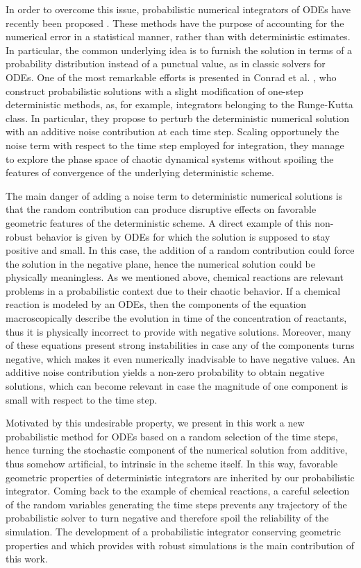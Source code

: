 \documentclass{siamart1116}
\numberwithin{theorem}{section}
\newcommand{\corr}[1]{{\color{bordeaux}#1}}
\begin{document}
In order to overcome this issue, probabilistic numerical integrators of ODEs have recently been proposed \cite{CGS16, KeH16}. These methods have the purpose of accounting for the numerical error in a statistical manner, rather than with deterministic estimates. In particular, the common underlying idea is to furnish the solution in terms of a probability distribution instead of a punctual value, as in classic solvers for ODEs. One of the most remarkable efforts is presented in Conrad et al. \cite{CGS16}, who construct probabilistic solutions with a slight modification of one-step deterministic methods, as, for example, integrators belonging to the Runge-Kutta class. In particular, they propose to perturb the deterministic numerical solution with an additive noise contribution at each time step. Scaling opportunely the noise term with respect to the time step employed for integration, they manage to explore the phase space of chaotic dynamical systems without spoiling the features of convergence of the underlying deterministic scheme. 

The main danger of adding a noise term to deterministic numerical solutions is that the random contribution can produce disruptive effects on favorable geometric features of the deterministic scheme. \corr{A direct example of this non-robust behavior is given by ODEs for which the solution is supposed to stay positive and small. In this case, the addition of a random contribution could force the solution in the negative plane, hence the numerical solution could be physically meaningless. As we mentioned above, chemical reactions are relevant problems in a probabilistic context due to their chaotic behavior. If a chemical reaction is modeled by an ODEs, then the components of the equation macroscopically describe the evolution in time of the concentration of reactants, thus it is physically incorrect to provide with negative solutions. Moreover, many of these equations present strong instabilities in case any of the components turns negative, which makes it even numerically inadvisable to have negative values. An additive noise contribution yields a non-zero probability to obtain negative solutions, which can become relevant in case the magnitude of one component is small with respect to the time step.}

Motivated by this undesirable property, we present in this work a new probabilistic method for ODEs based on a random selection of the time steps, hence turning the stochastic component of the numerical solution from additive, thus somehow artificial, to intrinsic in the scheme itself. \corr{In this way, favorable geometric properties of deterministic integrators are inherited by our probabilistic integrator. Coming back to the example of chemical reactions, a careful selection of the random variables generating the time steps prevents any trajectory of the probabilistic solver to turn negative and therefore spoil the reliability of the simulation. The development of a probabilistic integrator conserving geometric properties and which provides with robust simulations is the main contribution of this work.}
\end{document}
